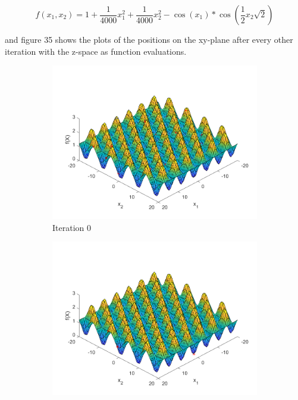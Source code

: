 $$
  f(x_1, x_2) = 1 + \frac{1}{4000}x_1^2 + \frac{1}{4000}x_2^2 - \cos(x_1) * \cos(\frac{1}{2}x_2\sqrt{2})
$$

and figure 35 shows the plots of the positions on the xy-plane after every other iteration with the z-space as function evaluations.

\begin{figure}
 \begin{subfigure}[b]{0.4\textwidth}
   \includegraphics[width=\textwidth]{img/smpl/grwnk2d/loa-iter-0}
   \caption{Iteration 0}
   \label{fig:s3-iter-0}
 \end{subfigure}
 \begin{subfigure}[b]{0.4\textwidth}
   \includegraphics[width=\textwidth]{img/smpl/grwnk2d/loa-iter-7}

\end{subfigure}
\end{figure}
